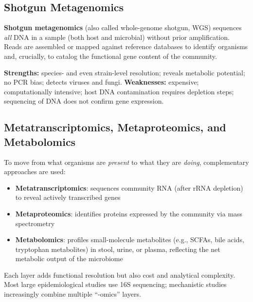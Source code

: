 \documentclass{tufte-handout}
\begin{document}
\subsection{Shotgun Metagenomics}

\textbf{Shotgun metagenomics} (also called whole-genome shotgun, WGS) sequences \textit{all} DNA in a sample (both host and microbial) without prior amplification. Reads are assembled or mapped against reference databases to identify organisms and, crucially, to catalog the functional gene content of the community.

\textbf{Strengths:} species- and even strain-level resolution; reveals metabolic potential; no PCR bias; detects viruses and fungi. \textbf{Weaknesses:} expensive; computationally intensive; host DNA contamination requires depletion steps; sequencing of DNA does not confirm gene expression.

\subsection{Metatranscriptomics, Metaproteomics, and Metabolomics}

To move from what organisms are \textit{present} to what they are \textit{doing}, complementary approaches are used:

\begin{itemize}
  \item \textbf{Metatranscriptomics}: sequences community RNA (after rRNA depletion) to reveal actively transcribed genes
  \item \textbf{Metaproteomics}: identifies proteins expressed by the community via mass spectrometry
  \item \textbf{Metabolomics}: profiles small-molecule metabolites (e.g., SCFAs, bile acids, tryptophan metabolites) in stool, urine, or plasma, reflecting the net metabolic output of the microbiome
\end{itemize}

Each layer adds functional resolution but also cost and analytical complexity. Most large epidemiological studies use 16S sequencing; mechanistic studies increasingly combine multiple ``-omics'' layers.
\end{document}
